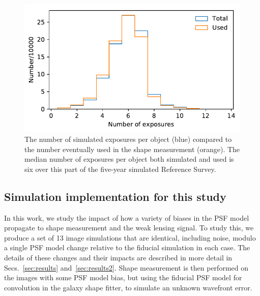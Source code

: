 \documentclass[usenatbib]{mnras}
\begin{document}
\begin{figure}
\begin{center}
\includegraphics[width=\columnwidth]{figures/hist2.pdf}
\end{center}
\caption[]{
The number of simulated exposures per object (blue) compared to the number eventually used in the shape measurement (orange). The median number of exposures per object both simulated and used is six over this part of the five-year simulated Reference Survey.
\label{fig:hist2}}
\end{figure}

\subsection{Simulation implementation for this study}

In this work, we study the impact of how a variety of biases in the PSF model propagate to shape measurement and the weak lensing signal. 
To study this, we produce a set of 13 image simulations that are identical, including noise, modulo a single PSF model change relative to the fiducial simulation in each case. 
The details of these changes and their impacts are described in more detail in Secs.~\ref{sec:results} and~\ref{sec:results2}. 
Shape measurement is then performed on the images with some PSF model bias, but using the fiducial PSF model for convolution in the galaxy shape fitter, to simulate an unknown wavefront error.
\end{document}
